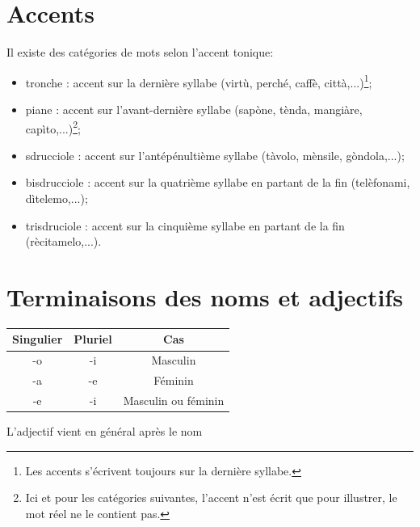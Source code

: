 \documentclass[12pt, openany]{report}
\begin{document}
\section{Accents}
Il existe des catégories de mots selon l'accent tonique:
\begin{itemize}
    \item tronche : accent sur la dernière syllabe (virtù, perché, caffè, città,...)\footnote{Les accents s'écrivent toujours sur la dernière syllabe.};
    \item piane : accent sur l'avant-dernière syllabe (sapòne, tènda, mangiàre, capìto,...)\footnote{Ici et pour les catégories suivantes, l'accent n'est écrit que pour illustrer, le mot réel ne le contient pas.};
    \item sdrucciole : accent sur l'antépénultième syllabe (tàvolo, mènsile, gòndola,...);
    \item bisdrucciole : accent sur la quatrième syllabe en partant de la fin (telèfonami, dìtelemo,...);
    \item trisdruciole : accent sur la cinquième syllabe en partant de la fin (rècitamelo,...).
\end{itemize}
\section{Terminaisons des noms et adjectifs}
\begin{center}
    \begin{tabular}{c|c|c}
        Singulier & Pluriel & Cas\\
        \hline
        -o & -i & Masculin \\
        -a & -e & Féminin \\
        -e & -i & Masculin ou féminin\\
    \end{tabular}
\end{center}
L'adjectif vient en général après le nom 
\end{document}
